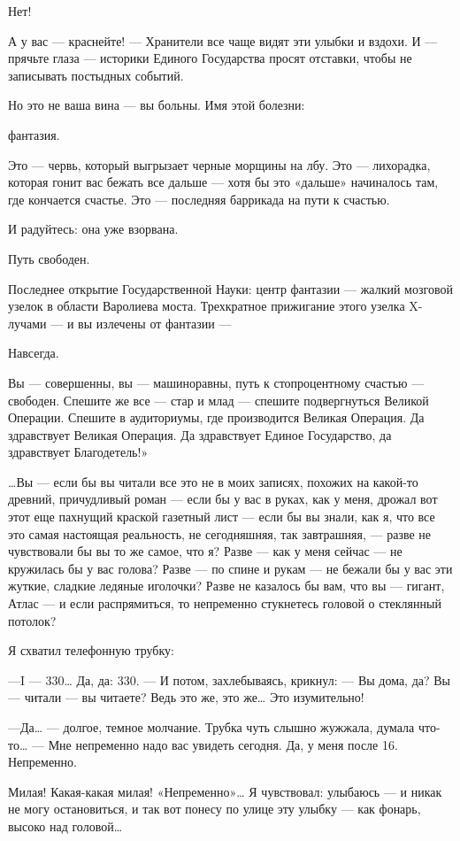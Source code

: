 \documentclass[11pt,openany]{book}
\begin{document}
Нет!

А у вас --- краснейте! --- Хранители все чаще видят эти улыбки и вздохи. И --- прячьте глаза --- историки Единого Государства просят отставки, чтобы не записывать постыдных событий.

Но это не ваша вина --- вы больны. Имя этой болезни:

фантазия.

Это --- червь, который выгрызает черные морщины на лбу. Это --- лихорадка, которая гонит вас бежать все дальше --- хотя бы это «дальше» начиналось там, где кончается счастье. Это --- последняя баррикада на пути к счастью.

И радуйтесь: она уже взорвана.

Путь свободен.

Последнее открытие Государственной Науки: центр фантазии --- жалкий мозговой узелок в области Варолиева моста. Трехкратное прижигание этого узелка X-лучами --- и вы излечены от фантазии ---

Навсегда.

Вы --- совершенны, вы --- машиноравны, путь к стопроцентному счастью --- свободен. Спешите же все --- стар и млад --- спешите подвергнуться Великой Операции. Спешите в аудиториумы, где производится Великая Операция. Да здравствует Великая Операция. Да здравствует Единое Государство, да здравствует Благодетель!»

\ldots{}Вы --- если бы вы читали все это не в моих записях, похожих на какой-то древний, причудливый роман --- если бы у вас в руках, как у меня, дрожал вот этот еще пахнущий краской газетный лист --- если бы вы знали, как я, что все это самая настоящая реальность, не сегодняшняя, так завтрашняя, --- разве не чувствовали бы вы то же самое, что я? Разве --- как у меня сейчас --- не кружилась бы у вас голова? Разве --- по спине и рукам --- не бежали бы у вас эти жуткие, сладкие ледяные иголочки? Разве не казалось бы вам, что вы --- гигант, Атлас --- и если распрямиться, то непременно стукнетесь головой о стеклянный потолок?

Я схватил телефонную трубку:

---I --- 330\ldots{} Да, да: 330. --- И потом, захлебываясь, крикнул: --- Вы дома, да? Вы --- читали --- вы читаете? Ведь это же, это же\ldots{} Это изумительно!

---Да\ldots{} --- долгое, темное молчание. Трубка чуть слышно жужжала, думала что-то\ldots{} --- Мне непременно надо вас увидеть сегодня. Да, у меня после 16. Непременно.

Милая! Какая-какая милая! «Непременно»\ldots{} Я чувствовал: улыбаюсь --- и никак не могу остановиться, и так вот понесу по улице эту улыбку --- как фонарь, высоко над головой\ldots{}
\end{document}

